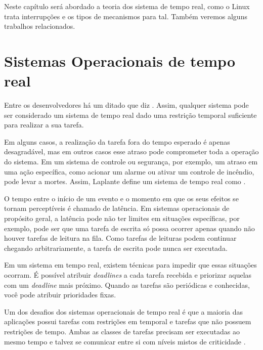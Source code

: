 
Neste capítulo será abordado a teoria dos sistema de tempo real, como o Linux trata interrupções e os tipos de mecanismos para tal. Também veremos alguns trabalhos relacionados.

\section{Sistemas Operacionais de tempo real}

Entre os desenvolvedores há um ditado que diz . Assim, qualquer sistema pode ser considerado um sistema de tempo real dado uma restrição temporal suficiente para realizar a sua tarefa.

Em alguns casos, a realização da tarefa fora do tempo esperado é apenas desagradável, mas em outros casos esse atraso pode comprometer toda a operação do sistema. Em um sistema de controle ou segurança, por exemplo, um atraso em uma ação específica, como acionar um alarme ou ativar um controle de incêndio, pode levar a mortes. Assim, Laplante define um sistema de tempo real como  \cite{Laplante2004}. 

O tempo entre o início de um evento e o momento em que os seus efeitos se tornam perceptíveis é chamado de latência. Em sistemas operacionais de propósito geral, a latência pode não ter limites em situações específicas, por exemplo, pode ser que uma tarefa de escrita só possa ocorrer apenas quando não houver tarefas de leitura na fila. Como tarefas de leituras podem continuar chegando arbitrariamente, a tarefa de escrita pode nunca ser executada.

Em um sistema em tempo real, existem técnicas para impedir que essas situações ocorram. É possível atribuir \textit{deadlines} a cada tarefa recebida e priorizar aquelas com um \textit{deadline} mais próximo. Quando as tarefas são periódicas e conhecidas, você pode atribuir prioridades fixas.

Um dos desafios dos sistemas operacionais de tempo real é que a maioria das aplicações possui tarefas com restrições em temporal e tarefas que não possuem restrições de tempo. Ambas as classes de tarefas precisam ser executadas ao mesmo tempo e talvez se comunicar entre si com níveis mistos de criticidade \cite{Cartwrigh2018}.

